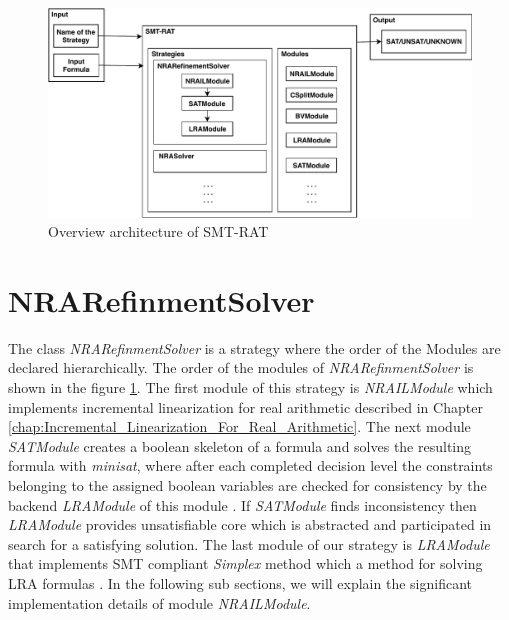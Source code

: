 \begin{figure}[ht!]
  \centering
  \includegraphics[width=.9\linewidth]{./figures/smtrat-arch.pdf}
  \caption{Overview architecture of SMT-RAT}
  \label{fig:overview_architecture_SMT-RAT}
\end{figure}


\section{NRARefinmentSolver}
\label{sec:nrarefinmentsolver}
\begin{sloppypar}
The class \textit{NRARefinmentSolver} is a strategy where the order of the Modules are declared hierarchically.
The order of the modules of \textit{NRARefinmentSolver} is shown in the figure \ref{fig:overview_architecture_SMT-RAT}.
The first module of this strategy is \textit{NRAILModule} which implements incremental linearization for real arithmetic described in Chapter \ref{chap:Incremental_Linearization_For_Real_Arithmetic}.
The next module \textit{SATModule} creates a boolean skeleton of a formula and solves the resulting formula with \textit{minisat}, where after each completed decision level the constraints belonging to the assigned boolean variables are checked for consistency by the backend \textit{LRAModule} of this module \cite{manual:smt-rat}.
If \textit{SATModule} finds inconsistency then \textit{LRAModule} provides unsatisfiable core which is abstracted and participated in search for a satisfying solution.
The last module of our strategy is \textit{LRAModule} that implements SMT compliant \textit{Simplex} method which a method for solving LRA formulas \cite{manual:smt-rat}.
In the following sub sections, we will explain the significant implementation details of module \textit{NRAILModule}.
\end{sloppypar}


